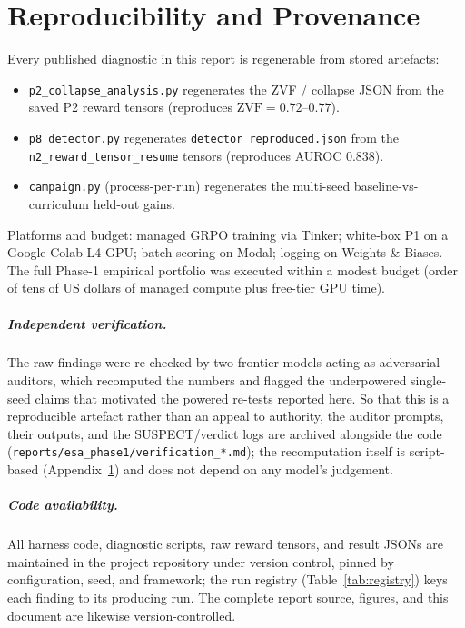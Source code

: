\documentclass[12pt,a4paper]{report}
\newcommand{\zvf}{\mathrm{ZVF}}
\begin{document}
\chapter{Reproducibility and Provenance}
\label{app:repro}
Every published diagnostic in this report is regenerable from stored artefacts:
\begin{itemize}[leftmargin=1.4em,itemsep=1pt]
  \item \texttt{p2\_collapse\_analysis.py} regenerates the ZVF / collapse JSON from
  the saved P2 reward tensors (reproduces $\zvf=0.72$--$0.77$).
  \item \texttt{p8\_detector.py} regenerates \texttt{detector\_reproduced.json} from
  the \texttt{n2\_reward\_tensor\_resume} tensors (reproduces AUROC $0.838$).
  \item \texttt{campaign.py} (process-per-run) regenerates the multi-seed
  baseline-vs-curriculum held-out gains.
\end{itemize}
Platforms and budget: managed GRPO training via Tinker; white-box P1 on a Google
Colab L4 GPU; batch scoring on Modal; logging on Weights \& Biases. The full
Phase-1 empirical portfolio was executed within a modest budget (order of tens of
US dollars of managed compute plus free-tier GPU time).

\paragraph{Independent verification.} The raw findings were re-checked by two frontier
models acting as adversarial auditors, which recomputed the numbers and flagged the
underpowered single-seed claims that motivated the powered re-tests reported here. So
that this is a reproducible artefact rather than an appeal to authority, the auditor
prompts, their outputs, and the SUSPECT/verdict logs are archived alongside the code
(\texttt{reports/esa\_phase1/verification\_*.md}); the recomputation itself is
script-based (Appendix~\ref{app:repro}) and does not depend on any model's judgement.

\paragraph{Code availability.} All harness code, diagnostic scripts, raw reward tensors,
and result JSONs are maintained in the project repository under version control, pinned
by configuration, seed, and framework; the run registry (Table~\ref{tab:registry}) keys
each finding to its producing run. The complete report source, figures, and this
document are likewise version-controlled.
\end{document}
